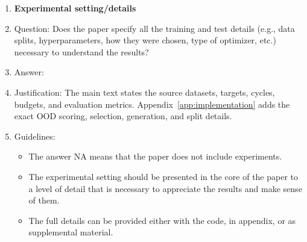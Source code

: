 \documentclass{article}
\begin{document}
\begin{enumerate}
\item {\bf Experimental setting/details}
    \item[] Question: Does the paper specify all the training and test details (e.g., data splits, hyperparameters, how they were chosen, type of optimizer, etc.) necessary to understand the results?
    \item[] Answer: \answerYes{}
    \item[] Justification: The main text states the source datasets, targets, cycles, budgets, and evaluation metrics. Appendix~\ref{app:implementation} adds the exact OOD scoring, selection, generation, and split details.
    \item[] Guidelines:
    \begin{itemize}
        \item The answer NA means that the paper does not include experiments.
        \item The experimental setting should be presented in the core of the paper to a level of detail that is necessary to appreciate the results and make sense of them.
        \item The full details can be provided either with the code, in appendix, or as supplemental material.
    \end{itemize}


\end{enumerate}
\end{document}
